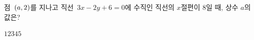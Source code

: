 점~$(a{,}\mkern3mu 2)$를 지나고 직선~$3x-2y+6=0$에 수직인 직선의 $x$절편이 $8$일 때, 상수 $a$의 값은?
\begin{choices32}{$1$}{$2$}{$3$}{$4$}{$5$}\end{choices32}
